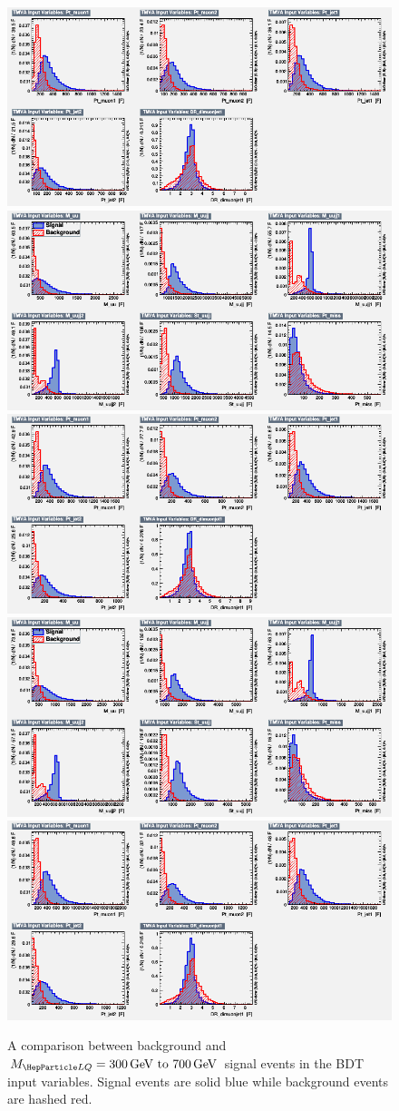 \begin{figure}[H]
    {\includegraphics[width=.49\textwidth]{Images/Analysis/Results_LQToBMu_pair_uubj_BDTG_FullRun2_2023_01_25_020318/500/variables_id_c2.png}}
    {\includegraphics[width=.49\textwidth]{Images/Analysis/Results_LQToBMu_pair_uubj_BDTG_FullRun2_2023_01_25_020318/600/variables_id_c1.png}}
    {\includegraphics[width=.49\textwidth]{Images/Analysis/Results_LQToBMu_pair_uubj_BDTG_FullRun2_2023_01_25_020318/600/variables_id_c2.png}}
    {\includegraphics[width=.49\textwidth]{Images/Analysis/Results_LQToBMu_pair_uubj_BDTG_FullRun2_2023_01_25_020318/700/variables_id_c1.png}}
    {\includegraphics[width=.49\textwidth]{Images/Analysis/Results_LQToBMu_pair_uubj_BDTG_FullRun2_2023_01_25_020318/700/variables_id_c2.png}}
    \caption{A comparison between background and $\MLQ = \SIrange{300}{700}{GeV}$ signal events in the BDT input variables. Signal events are solid blue while background events are hashed red.}
    \label{figapp:variables1}
\end{figure}

